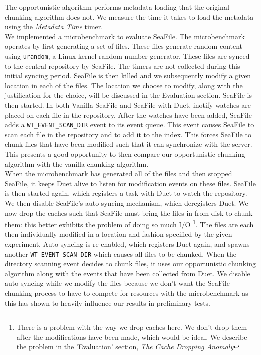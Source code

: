 \documentclass[table]{article}
\newcommand{\code}[1]{\texttt{#1}}
\begin{document}
\begin{multicols}{2}
The opportunistic algorithm performs metadata loading that the original chunking algorithm does not. We measure the time it takes to load the metadata using the \textit{Metadata Time} timer.\\

We implemented a microbenchmark to evaluate SeaFile. The microbenchmark operates by first generating a set of files. These files generate random content using \code{urandom}, a Linux kernel random number generator. These files are synced to the central repository by SeaFile. The timers are not collected during this initial syncing period. SeaFile is then killed and we subsequently modify a given location in each of the files. The location we choose to modify, along with the justification for the choice, will be discussed in the Evaluation section. SeaFile is then started. In both Vanilla SeaFile and SeaFile with Duet, inotify watches are placed on each file in the repository. After the watches have been added, SeaFile adds a \code{WT\_EVENT\_SCAN\_DIR} event to its event queue. This event causes SeaFile to scan each file in the repository and to add it to the index. This forces SeaFile to chunk files that have been modified such that it can synchronize with the server. This presents a good opportunity to then compare our opportunistic chunking algorithm with the vanilla chunking algorithm.\\

When the microbenchmark has generated all of the files and then stopped SeaFile, it keeps Duet alive to listen for modification events on these files. SeaFile is then started again, which registers a task with Duet to watch the repository. We then disable SeaFile's auto-syncing mechanism, which deregisters Duet. We now drop the caches such that SeaFile must bring the files in from disk to chunk them: this better exhibits the problem of doing so much I/O \footnote{There is a problem with the way we drop caches here. We don't drop them after the modifications have been made, which would be ideal. We describe the problem in the 'Evaluation' section, \textit{The Cache Dropping Anomaly}}. The files are each then individually modified in a location and fashion specified by the given experiment. Auto-syncing is re-enabled, which registers Duet again, and spawns another \code{WT\_EVENT\_SCAN\_DIR} which causes all files to be chunked. When the directory scanning event decides to chunk files, it uses our opportunistic chunking algorithm along with the events that have been collected from Duet. We disable auto-syncing while we modify the files because we don't want the SeaFile chunking process to have to compete for resources with the microbenchmark as this has shown to heavily influence our results in preliminary tests.\\


\end{multicols}
\end{document}
